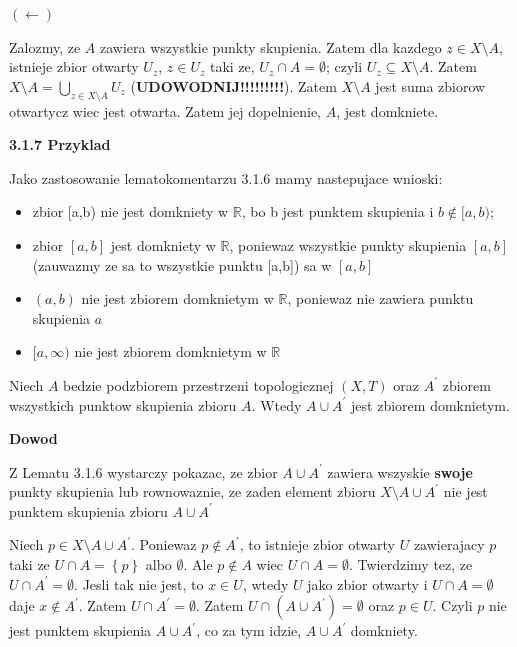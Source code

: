 \documentclass{article}
\begin{document}
$(\leftarrow)$

Zalozmy, ze $A$ zawiera wszystkie punkty skupienia. Zatem dla kazdego $z \in X\setminus A$, istnieje zbior otwarty $U_{z}$, $z \in U_{z}$ taki ze, $U_{z} \cap A = \emptyset$; czyli $U_{z} \subseteq X\setminus A$. Zatem $X\setminus A = \bigcup\limits_{z \in X\setminus A}U_{z}$ (\textbf{UDOWODNIJ!!!!!!!!!}). Zatem $X\setminus A$ jest suma zbiorow otwartycz wiec jest otwarta. Zatem jej dopelnienie, $A$, jest domkniete. 

\textbf{3.1.7 Przyklad}

Jako zastosowanie lematokomentarzu 3.1.6 mamy nastepujace wnioski:
\begin{itemize}
    \item zbior [a,b) nie jest domkniety w $\mathbb{R}$, bo b jest punktem skupienia i $b \not\in [a,b)$;
    \item zbior $[a,b]$ jest domkniety w $\mathbb{R}$, poniewaz wszystkie punkty skupienia $[a,b]$(zauwazmy ze sa to wszystkie punktu [a,b]) sa w $[a,b]$
    \item $(a,b)$ nie jest zbiorem domknietym w $\mathbb{R}$, poniewaz nie zawiera punktu skupienia $a$
    \item $[a, \infty)$ nie jest zbiorem domknietym w $\mathbb{R}$  
\end{itemize}

\begin{tcolorbox}[colback=white!90!green,colframe=black!35!green,title=3.1.8 Lematokomentarz: domknietosc  $A \cup A^{\prime}$]

    Niech $A$ bedzie podzbiorem przestrzeni topologicznej $(X,T)$ oraz $A^{\prime}$ zbiorem wszystkich punktow skupienia zbioru $A$. Wtedy $A \cup A^{\prime}$ jest zbiorem domknietym.

\end{tcolorbox}

\textbf{Dowod}

Z Lematu 3.1.6 wystarczy pokazac, ze zbior $A \cup A^{\prime}$ zawiera wszyskie \textbf{swoje} punkty skupienia lub rownowaznie, ze zaden element zbioru $X \setminus A\cup A^{\prime}$ nie jest punktem skupienia zbioru $A\cup A^{\prime}$

Niech $p \in X \setminus A \cup A^{\prime}$. Poniewaz $p \notin A^{\prime}$, to istnieje zbior otwarty $U$ zawierajacy $p$ taki ze $U \cap A = \left\{ p \right\}$ albo $\emptyset$. Ale $p\notin A$ wiec $U\cap A = \emptyset$. Twierdzimy tez, ze $U \cap A^{\prime} = \emptyset$. Jesli tak nie jest, to $x \in U$, wtedy $U$ jako zbior otwarty i $U\cap A = \emptyset$ daje $x\notin A^{\prime}$. Zatem $U\cap A^{\prime} = \emptyset$. Zatem $U \cap (A\cup A^{\prime}) = \emptyset$ oraz $p\in U$. Czyli $p$ nie jest punktem skupienia $A\cup A^{\prime}$, co za tym idzie, $A\cup A^{\prime}$ domkniety.
\end{document}
